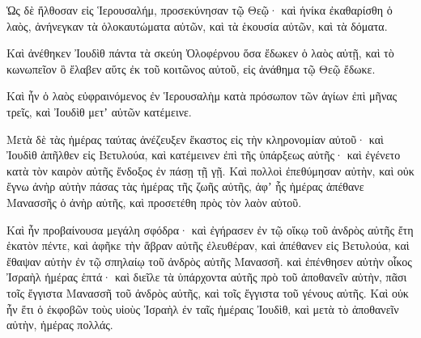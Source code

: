 {\par }{\PP {}Ὡς δὲ ἤλθοσαν εἰς Ἱερουσαλήμ, προσεκύνησαν τῷ Θεῷ· καὶ ἡνίκα ἐκαθαρίσθη ὁ λαὸς, ἀνήνεγκαν τὰ ὁλοκαυτώματα αὐτῶν, καὶ τὰ ἑκουσία αὐτῶν, καὶ τὰ δόματα.
\par }{\PP {}Καὶ ἀνέθηκεν Ἰουδὶθ πάντα τὰ σκεύη Ὀλοφέρνου ὅσα ἔδωκεν ὁ λαὸς αὐτῇ, καὶ τὸ κωνωπεῖον ὃ ἔλαβεν αὕτς ἐκ τοῦ κοιτῶνος αὐτοῦ, εἰς ἀνάθημα τῷ Θεῷ ἔδωκε.
\par }{\PP {}Καὶ ἦν ὁ λαὸς εὐφραινόμενος ἐν Ἱερουσαλὴμ κατὰ πρόσωπον τῶν ἁγίων ἐπὶ μῆνας τρεῖς, καὶ Ἰουδὶθ μετʼ αὐτῶν κατέμεινε.
\par }{\PP {}Μετὰ δὲ τὰς ἡμέρας ταύτας ἀνέζευξεν ἕκαστος εἰς τὴν κληρονομίαν αὐτοῦ· καὶ Ἰουδὶθ ἀπῆλθεν εἰς Βετυλούα, καὶ κατέμεινεν ἐπὶ τῆς ὑπάρξεως αὐτῆς· καὶ ἐγένετο κατὰ τὸν καιρὸν αὐτῆς ἔνδοξος ἐν πάσῃ τῇ γῇ.
Καὶ πολλοὶ ἐπεθύμησαν αὐτὴν, καὶ οὐκ ἔγνω ἀνὴρ αὐτὴν πάσας τὰς ἡμέρας τῆς ζωῆς αὐτῆς, ἀφʼ ἧς ἡμέρας ἀπέθανε Μανασσῆς ὁ ἀνὴρ αὐτῆς, καὶ προσετέθη πρὸς τὸν λαὸν αὐτοῦ.
\par }{\PP {}Καὶ ἦν προβαίνουσα μεγάλη σφόδρα· καὶ ἐγήρασεν ἐν τῷ οἴκῳ τοῦ ἀνδρὸς αὐτῆς ἔτη ἑκατὸν πέντε, καὶ ἀφῆκε τὴν ἅβραν αὐτῆς ἐλευθέραν, καὶ ἀπέθανεν εἰς Βετυλούα, καὶ ἔθαψαν αὐτὴν ἐν τῷ σπηλαίῳ τοῦ ἀνδρὸς αὐτῆς Μανασσῆ.
καὶ ἐπένθησεν αὐτὴν οἶκος Ἰσραὴλ ἡμέρας ἑπτά· καὶ διεῖλε τὰ ὑπάρχοντα αὐτῆς πρὸ τοῦ ἀποθανεῖν αὐτὴν, πᾶσι τοῖς ἔγγιστα Μανασσῆ τοῦ ἀνδρὸς αὐτῆς, καὶ τοῖς ἔγγιστα τοῦ γένους αὐτῆς.
Καὶ οὐκ ἦν ἔτι ὁ ἐκφοβῶν τοὺς υἱοὺς Ἰσραὴλ ἐν ταῖς ἡμέραις Ἰουδὶθ, καὶ μετὰ τὸ ἀποθανεῖν αὐτὴν, ἡμέρας πολλάς.
\par }